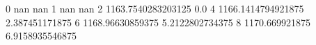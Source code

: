 0 nan nan
1 nan nan
2 1163.7540283203125 0.0
4 1166.1414794921875 2.387451171875
6 1168.96630859375 5.2122802734375
8 1170.669921875 6.9158935546875
